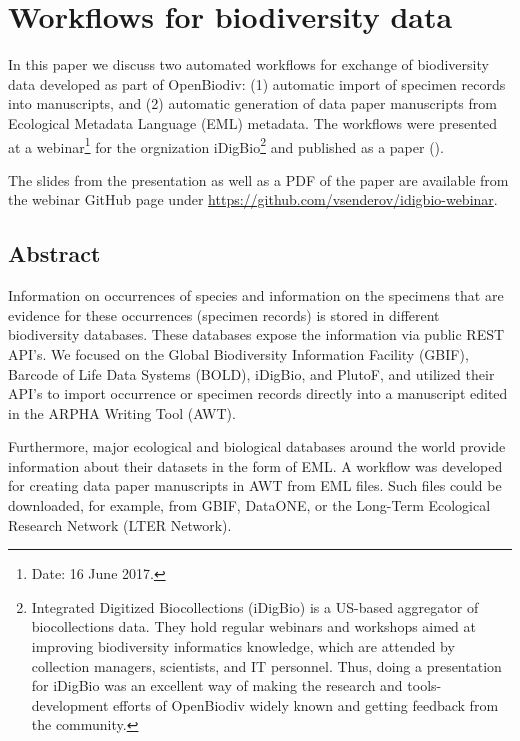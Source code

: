 \chapter{Workflows for biodiversity data}
\label{chapter-case-study}

In this paper we discuss two automated workflows for exchange of biodiversity data developed as part of OpenBiodiv: (1) automatic import of specimen records into manuscripts, and (2) automatic generation of data paper manuscripts from Ecological Metadata Language (EML) metadata. The workflows were presented at a webinar\footnote{Date: 16 June 2017.} for the orgnization iDigBio\footnote{Integrated Digitized Biocollections (iDigBio) is a US-based aggregator of biocollections data. They hold regular webinars and workshops aimed at improving biodiversity informatics knowledge, which are attended by collection managers, scientists, and IT personnel. Thus, doing a presentation for iDigBio was an excellent way of making the research and tools-development efforts of OpenBiodiv widely known and getting feedback from the community.} and published as a paper (\cite{senderov_online_2016}).

The slides from the presentation as well as a PDF of the paper are available from the webinar GitHub page under \url{https://github.com/vsenderov/idigbio-webinar}.

\section{Abstract}

Information on occurrences of species and information on the specimens that are evidence for these occurrences (specimen records) is stored in different biodiversity databases. These databases expose the information via public REST API's. We focused on the Global Biodiversity Information Facility (GBIF), Barcode of Life Data Systems (BOLD), iDigBio, and PlutoF, and utilized their API's to import occurrence or specimen records directly into a manuscript edited in the ARPHA Writing Tool (AWT).

Furthermore, major ecological and biological databases around the world provide information about their datasets in the form of EML. A workflow was developed for creating data paper manuscripts in AWT from EML files. Such files could be downloaded, for example, from GBIF, DataONE, or the Long-Term Ecological Research Network (LTER Network).

